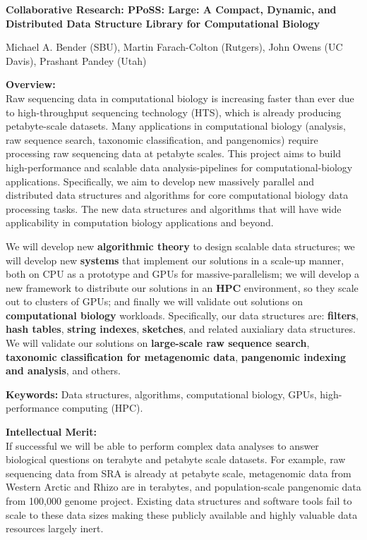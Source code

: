 
\begin{center}
\bf
\Large
Collaborative Research: PPoSS\@: Large: A Compact, Dynamic, and Distributed Data
Structure Library for Computational Biology

\medskip
\small
Michael A. Bender (SBU), Martin Farach-Colton (Rutgers), John Owens (UC Davis),
Prashant Pandey (Utah)
\end{center}


\noindent \textbf{\large Overview:}\\
Raw sequencing data in computational biology is increasing faster than ever due to high-throughput sequencing technology (HTS), which is already producing petabyte-scale datasets. Many applications in computational biology (\kmer analysis, raw sequence search, taxonomic classification, and pangenomics) require processing raw sequencing data at petabyte scales. This project aims to build high-performance and scalable data analysis-pipelines for computational-biology applications. Specifically, we aim to develop new massively parallel and distributed data structures and algorithms for core computational biology data processing tasks. The new data structures and algorithms that will have wide applicability in computation biology applications and beyond.

We will develop new \textbf{algorithmic theory} to design scalable data structures; we will develop new \textbf{systems} that implement our solutions in a scale-up manner,  both on CPU as a prototype and GPUs for massive-parallelism; we will develop a new framework to distribute our solutions in an \textbf{HPC} environment, so they  scale out to clusters of GPUs; and finally we will validate out solutions on \textbf{computational biology} workloads.
%
Specifically, our data structures are: \textbf{filters}, \textbf{hash tables}, \textbf{string indexes}, \textbf{sketches}, and related auxialiary data structures.  We will validate our solutions on \textbf{large-scale raw sequence search}, \textbf{taxonomic classification for metagenomic data}, \textbf{pangenomic indexing and analysis}, and others.


\noindent \textbf{\large Keywords:} Data structures, algorithms, computational biology, GPUs, high-performance computing (HPC).

\noindent \textbf{\large Intellectual Merit:}\\
If successful we will be able to perform complex data analyses to answer biological questions on terabyte and petabyte scale datasets. For example, raw sequencing data from SRA is already at petabyte scale, metagenomic data from Western Arctic and Rhizo are in terabytes, and population-scale pangenomic data from 100,000 genome project. Existing data structures and software tools fail to scale to these data sizes making these publicly available and highly valuable data resources largely inert.

